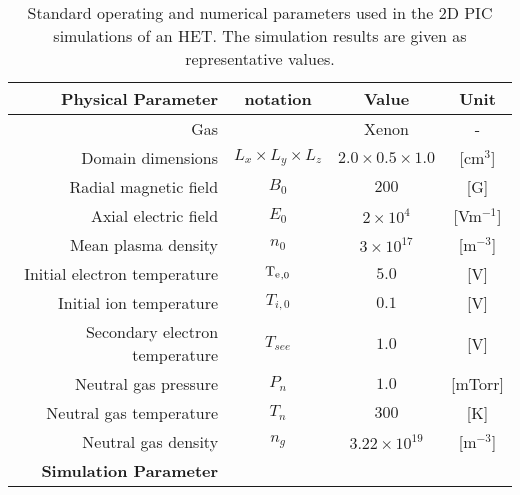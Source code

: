   \begin{table}[htbp] %
       \centering
       \caption{\label{parameters} Standard operating and numerical parameters used in the 2D PIC simulations of an HET.  The simulation results are given as representative values.}
       \begin{tabular}{@{}r c c c@{}} 
          \toprule
          {\bf Physical Parameter} & notation & Value & Unit \\
          \midrule
          Gas & & Xenon & - \\
          Domain dimensions & $L_{x} \times L_{y} \times L_{z}$ & $2.0 \times 0.5 \times 1.0$ & [cm$^3$] \\
          Radial magnetic field & $B_{0}$                    & $200$                 & [{G}] \\
          Axial electric field & $E_{0}$                    & $2 \times 10^{4}$     & [{Vm}$^{-1}$] \\
          Mean plasma density & $n_{0}$                    & $3 \times 10^{17}$    & [{m}$^{-3}$] \\
          Initial electron temperature & $\mathrm{T_e}_{,0}  $               & $5.0$                 & [{V}] \\
          Initial ion temperature & $T_{i,0}   $               & $0.1$                 & [{V}] \\
          Secondary electron temperature & $T_{see}   $               & $1.0$                 & [{V}] \\
          Neutral gas pressure & $P_{n}     $               & $1.0$                 & [{mTorr}] \\
          Neutral gas temperature & $T_{n}     $               & $300$                 & [{K}] \\
          Neutral gas density & $n_{g}     $               & $3.22 \times 10^{19}$ & [{m}$^{-3}$]\\
          \midrule
          {\bf Simulation Parameter} &  &   &  \\
          

\end{tabular}
\end{table}
